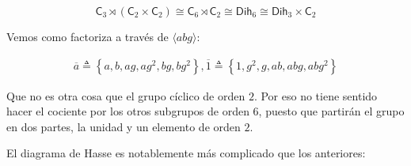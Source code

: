 \documentclass[12pt,a4paper,fleqn,spanish,final,openright]{extbook}
\theoremstyle{definition}
\theoremstyle{remark}
\begin{document}
\[{\mathsf{C}_{3}}\rtimes{\left({{\mathsf{C}_{2}}   \times   {\mathsf{C}_{2}}}\right)}   \cong   {\mathsf{C}_{6}}\rtimes{\mathsf{C}_{2}}   \cong   \mathsf{Dih}_{6}   \cong   {\mathsf{Dih}_{3}} \times {\mathsf{C}_{2}}\]

Vemos como factoriza a través de $\langle abg\rangle$:

\begin{align*}
\overline{a}\triangleq{\left\lbrace{a,b,ag,ag^2,bg,bg^2}\right\rbrace},
\overline{1}\triangleq{\left\lbrace{1,g^2,g,ab,abg,abg^2}\right\rbrace}
\end{align*}

Que no es otra cosa que el grupo cíclico de orden $2$. Por eso no tiene sentido hacer el cociente por los otros subgrupos de orden $6$, puesto que partirán el grupo en dos partes, la unidad y un elemento de orden $2$.

El diagrama de Hasse es notablemente más complicado que  los anteriores:
\end{document}

